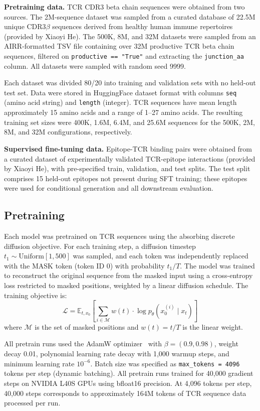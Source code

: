 \documentclass[12pt]{article}
\begin{document}
\textbf{Pretraining data.}
TCR CDR3 beta chain sequences were obtained from two sources. The 2M-sequence dataset was
sampled from a curated database of 22.5M unique CDR3$\beta$ sequences derived from healthy
human immune repertoires (provided by Xiaoyi He). The 500K, 8M, and 32M datasets were sampled
from an AIRR-formatted TSV file containing over 32M productive TCR beta chain sequences,
filtered on \texttt{productive == "True"} and extracting the \texttt{junction\_aa} column.
All datasets were sampled with random seed 9999.

Each dataset was divided 80/20 into training and validation sets with no held-out test set.
Data were stored in HuggingFace dataset format with columns \texttt{seq} (amino acid string)
and \texttt{length} (integer). TCR sequences have mean length approximately 15 amino acids and
a range of 1--27 amino acids. The resulting training set sizes were 400K, 1.6M, 6.4M, and
25.6M sequences for the 500K, 2M, 8M, and 32M configurations, respectively.

\textbf{Supervised fine-tuning data.}
Epitope-TCR binding pairs were obtained from a curated dataset of experimentally validated
TCR-epitope interactions (provided by Xiaoyi He), with pre-specified train, validation, and
test splits. The test split comprises 15 held-out epitopes not present during SFT training;
these epitopes were used for conditional generation and all downstream evaluation.

\subsection{Pretraining}

Each model was pretrained on TCR sequences using the absorbing discrete diffusion objective.
For each training step, a diffusion timestep $t_1 \sim \text{Uniform}[1, 500]$ was sampled,
and each token was independently replaced with the MASK token (token ID 0) with probability
$t_1 / T$. The model was trained to reconstruct the original sequence from the masked input
using a cross-entropy loss restricted to masked positions, weighted by a linear diffusion
schedule. The training objective is:
\begin{equation}
\mathcal{L} = \mathbb{E}_{t, x_0} \left[ \sum_{i \in \mathcal{M}} w(t) \cdot
  \log p_\theta(x_0^{(i)} \mid x_t) \right]
\end{equation}
where $\mathcal{M}$ is the set of masked positions and $w(t) = t/T$ is the linear weight.

All pretrain runs used the AdamW optimizer~\cite{loshchilov2019} with $\beta = (0.9, 0.98)$,
weight decay 0.01, polynomial learning rate decay with 1,000 warmup steps, and minimum
learning rate $10^{-6}$. Batch size was specified as \texttt{max\_tokens = 4096} tokens per
step (dynamic batching). All pretrain runs trained for 40,000 gradient steps on NVIDIA L40S
GPUs using bfloat16 precision. At 4,096 tokens per step, 40,000 steps corresponds to
approximately 164M tokens of TCR sequence data processed per run.
\end{document}
